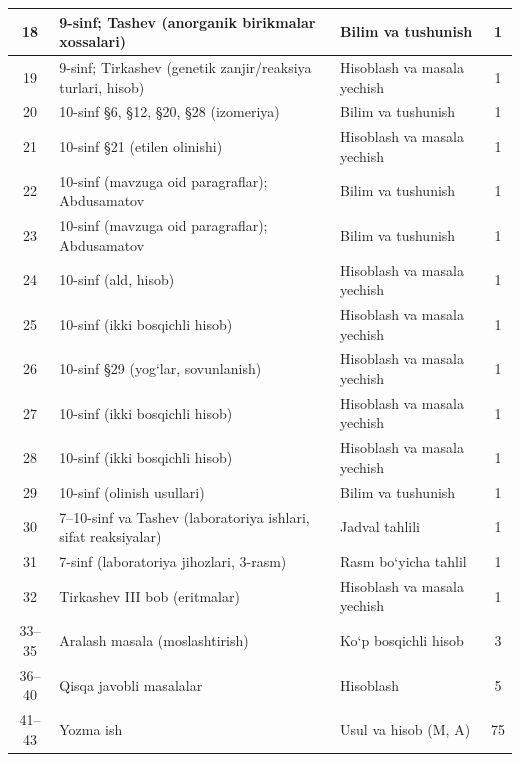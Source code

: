 \documentclass[11pt,a4paper]{article}
\begin{document}
{\begin{longtable}{|c|p{7.2cm}|p{5.4cm}|c|}
18 & 9-sinf; Tashev (anorganik birikmalar xossalari) & Bilim va tushunish & 1\\\hline
19 & 9-sinf; Tirkashev (genetik zanjir/reaksiya turlari, hisob) & Hisoblash va masala yechish & 1\\\hline
20 & 10-sinf \S{}6, \S{}12, \S{}20, \S{}28 (izomeriya) & Bilim va tushunish & 1\\\hline
21 & 10-sinf \S{}21 (etilen olinishi) & Hisoblash va masala yechish & 1\\\hline
22 & 10-sinf (mavzuga oid paragraflar); Abdusamatov & Bilim va tushunish & 1\\\hline
23 & 10-sinf (mavzuga oid paragraflar); Abdusamatov & Bilim va tushunish & 1\\\hline
24 & 10-sinf (ald, hisob) & Hisoblash va masala yechish & 1\\\hline
25 & 10-sinf (ikki bosqichli hisob) & Hisoblash va masala yechish & 1\\\hline
26 & 10-sinf \S{}29 (yog`lar, sovunlanish) & Hisoblash va masala yechish & 1\\\hline
27 & 10-sinf (ikki bosqichli hisob) & Hisoblash va masala yechish & 1\\\hline
28 & 10-sinf (ikki bosqichli hisob) & Hisoblash va masala yechish & 1\\\hline
29 & 10-sinf (olinish usullari) & Bilim va tushunish & 1\\\hline
30 & 7--10-sinf va Tashev (laboratoriya ishlari, sifat reaksiyalar) & Jadval tahlili & 1\\\hline
31 & 7-sinf (laboratoriya jihozlari, 3-rasm) & Rasm bo`yicha tahlil & 1\\\hline
32 & Tirkashev III bob (eritmalar) & Hisoblash va masala yechish & 1\\\hline
33--35 & Aralash masala (moslashtirish) & Ko`p bosqichli hisob & 3\\\hline
36--40 & Qisqa javobli masalalar & Hisoblash & 5\\\hline
41--43 & Yozma ish & Usul va hisob (M, A) & 75\\\hline
\end{longtable}}
\end{document}
